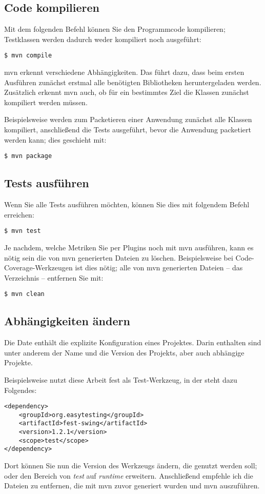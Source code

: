 \subsection{Code kompilieren}
Mit dem folgenden Befehl können Sie den Programmcode kompilieren; Testklassen werden dadurch weder kompiliert noch ausgeführt:
\begin{verbatim}
$ mvn compile
\end{verbatim}

\gls{mvn} erkennt verschiedene Abhängigkeiten. Das führt dazu, dass beim ersten Ausführen zunächst erstmal alle benötigten Bibliotheken heruntergeladen werden. Zusätzlich erkennt \gls{mvn} auch, ob für ein bestimmtes Ziel die Klassen zunächst kompiliert werden müssen.

Beispielsweise werden zum Packetieren einer Anwendung zunächst alle Klassen kompiliert, anschließend die Tests ausgeführt, bevor die Anwendung packetiert werden kann; dies geschieht mit:
\begin{verbatim}
$ mvn package
\end{verbatim}

\subsection{Tests ausführen}
Wenn Sie alle Tests ausführen möchten, können Sie dies mit folgendem Befehl erreichen:
\begin{verbatim}
$ mvn test
\end{verbatim}

Je nachdem, welche Metriken Sie per Plugins noch mit \gls{mvn} ausführen, kann es nötig sein die von \gls{mvn} generierten Dateien zu löschen. Beispielsweise bei Code-Coverage-Werkzeugen ist dies nötig; alle von \gls{mvn} generierten Dateien -- das Verzeichnis  -- entfernen Sie mit:
\begin{verbatim}
$ mvn clean
\end{verbatim}

\subsection{Abhängigkeiten ändern}
Die Date  enthält die explizite Konfiguration eines Projektes. Darin enthalten sind unter anderem der Name und die Version des Projekts, aber auch abhängige Projekte.

Beispielsweise nutzt diese Arbeit \gls{fest} als Test-Werkzeug, in der  steht dazu Folgendes:
\begin{verbatim}
<dependency>
    <groupId>org.easytesting</groupId>
    <artifactId>fest-swing</artifactId>
    <version>1.2.1</version>
    <scope>test</scope>
</dependency>
\end{verbatim}

Dort können Sie nun die Version des Werkzeugs ändern, die genutzt werden soll; oder den Bereich von \emph{test} auf \emph{runtime} erweitern. Anschließend empfehle ich die Dateien zu entfernen, die mit \gls{mvn} zuvor generiert wurden und \gls{mvn} auszuführen.
